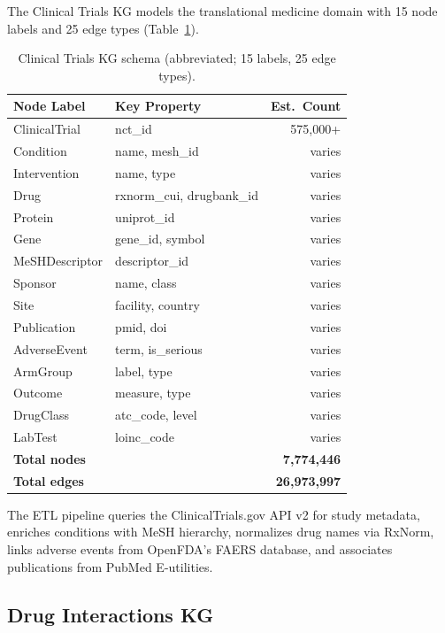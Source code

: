 \documentclass[11pt]{article}
\begin{document}
The Clinical Trials KG models the translational medicine domain with 15 node labels and 25 edge types (Table~\ref{tab:ct-schema}).

\begin{table}[H]
\centering
\caption{Clinical Trials KG schema (abbreviated; 15 labels, 25 edge types).}
\label{tab:ct-schema}
\small
\begin{tabular}{llr}
\toprule
\textbf{Node Label} & \textbf{Key Property} & \textbf{Est.\ Count} \\
\midrule
ClinicalTrial & nct\_id & 575,000+ \\
Condition & name, mesh\_id & varies \\
Intervention & name, type & varies \\
Drug & rxnorm\_cui, drugbank\_id & varies \\
Protein & uniprot\_id & varies \\
Gene & gene\_id, symbol & varies \\
MeSHDescriptor & descriptor\_id & varies \\
Sponsor & name, class & varies \\
Site & facility, country & varies \\
Publication & pmid, doi & varies \\
AdverseEvent & term, is\_serious & varies \\
ArmGroup & label, type & varies \\
Outcome & measure, type & varies \\
DrugClass & atc\_code, level & varies \\
LabTest & loinc\_code & varies \\
\midrule
\multicolumn{2}{l}{\textbf{Total nodes}} & \textbf{7,774,446} \\
\midrule
\multicolumn{2}{l}{\textbf{Total edges}} & \textbf{26,973,997} \\
\bottomrule
\end{tabular}
\end{table}

The ETL pipeline queries the ClinicalTrials.gov API v2 for study metadata, enriches conditions with MeSH hierarchy, normalizes drug names via RxNorm, links adverse events from OpenFDA's FAERS database, and associates publications from PubMed E-utilities.

\subsection{Drug Interactions KG}
\end{document}
